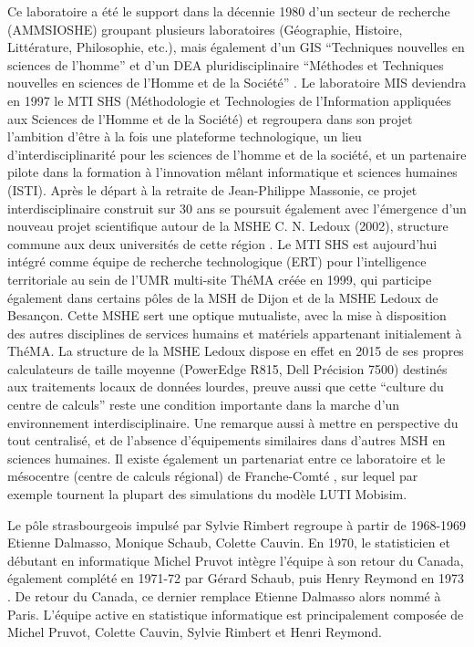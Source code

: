 Ce laboratoire a été le support dans la décennie 1980 d'un secteur de recherche (AMMSIOSHE) groupant plusieurs laboratoires (Géographie, Histoire, Littérature, Philosophie, etc.), mais également d'un GIS \enquote{Techniques nouvelles en sciences de l'homme} et d'un DEA pluridisciplinaire \enquote{Méthodes et Techniques nouvelles en sciences de l'Homme et de la Société} \autocite{TSH1984}. Le laboratoire MIS deviendra en 1997 le MTI SHS (Méthodologie et Technologies de l'Information appliquées aux Sciences de l'Homme et de la Société) \autocite{Girardot2004} et regroupera dans son projet l'ambition d'être à la fois une plateforme technologique, un lieu d'interdisciplinarité pour les sciences de l'homme et de la société, et un partenaire pilote dans la formation à l'innovation mêlant informatique et sciences humaines (ISTI). Après le départ à la retraite de Jean-Philippe Massonie, ce projet interdisciplinaire construit sur 30 ans se poursuit également avec l'émergence d'un nouveau projet scientifique autour de la MSHE C. N. Ledoux (2002), structure commune aux deux universités de cette région \autocites{Favory2003, Favory2009}. Le MTI SHS est aujourd'hui intégré comme équipe de recherche technologique (ERT) pour l'intelligence territoriale au sein de l'UMR multi-site ThéMA créée en 1999, qui participe également dans certains pôles de la MSH de Dijon et de la MSHE Ledoux de Besançon. Cette MSHE sert une optique mutualiste, avec la mise à disposition des autres disciplines de services humains et matériels appartenant initialement à ThéMA. La structure de la MSHE Ledoux dispose en effet en 2015 de ses propres calculateurs de taille moyenne (PowerEdge R815, Dell Précision 7500) destinés aux traitements locaux de données lourdes, preuve aussi que cette \enquote{culture du centre de calculs} reste une condition importante dans la marche d'un environnement interdisciplinaire. Une remarque aussi à mettre en perspective du tout centralisé, et de l'absence d'équipements similaires dans d'autres MSH en sciences humaines. Il existe également un partenariat entre ce laboratoire et le mésocentre (centre de calculs régional) de Franche-Comté \autocite{Asch2012}, sur lequel par exemple tournent la plupart des simulations du modèle LUTI Mobisim.\autocites{Thema2010, Hirtzel2015}

Le pôle strasbourgeois impulsé par Sylvie Rimbert regroupe à partir de 1968-1969 Etienne Dalmasso, Monique Schaub, Colette Cauvin. En 1970, le statisticien et débutant en informatique Michel Pruvot intègre l'équipe à son retour du Canada, également complété en 1971-72 par Gérard Schaub, puis Henry Reymond en 1973 \autocite[135-153]{Cuyala2014}. De retour du Canada, ce dernier remplace Etienne Dalmasso alors nommé à Paris. L'équipe active en statistique informatique est principalement composée de Michel Pruvot, Colette Cauvin, Sylvie Rimbert et Henri Reymond. %

